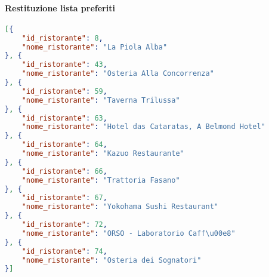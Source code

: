\paragraph{Restituzione lista preferiti}
\begin{lstlisting}[language=json]
[{
    "id_ristorante": 8,
    "nome_ristorante": "La Piola Alba"
}, {
    "id_ristorante": 43,
    "nome_ristorante": "Osteria Alla Concorrenza"
}, {
    "id_ristorante": 59,
    "nome_ristorante": "Taverna Trilussa"
}, {
    "id_ristorante": 63,
    "nome_ristorante": "Hotel das Cataratas, A Belmond Hotel"
}, {
    "id_ristorante": 64,
    "nome_ristorante": "Kazuo Restaurante"
}, {
    "id_ristorante": 66,
    "nome_ristorante": "Trattoria Fasano"
}, {
    "id_ristorante": 67,
    "nome_ristorante": "Yokohama Sushi Restaurant"
}, {
    "id_ristorante": 72,
    "nome_ristorante": "ORSO - Laboratorio Caff\u00e8"
}, {
    "id_ristorante": 74,
    "nome_ristorante": "Osteria dei Sognatori"
}]
\end{lstlisting}
